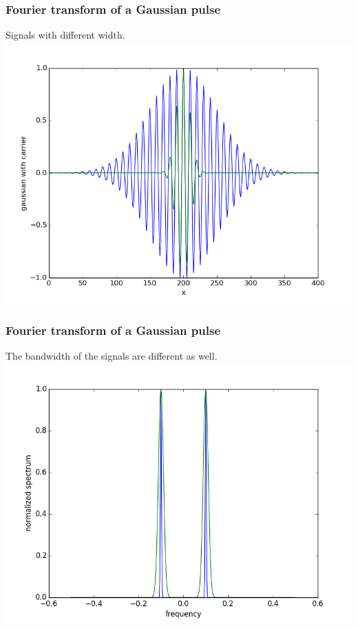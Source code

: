 \documentclass{beamer}
\begin{document}
\begin{frame}
\frametitle{Fourier transform of a Gaussian pulse}
Signals with different width.
\includegraphics[scale=0.45]{gaussian_carrier.png}
\end{frame}
\begin{frame}
\frametitle{Fourier transform of a Gaussian pulse}
The bandwidth of the signals are different as well.
\includegraphics[scale=0.45]{gaussian_carrier_dft.png}
\end{frame}
\end{document}
